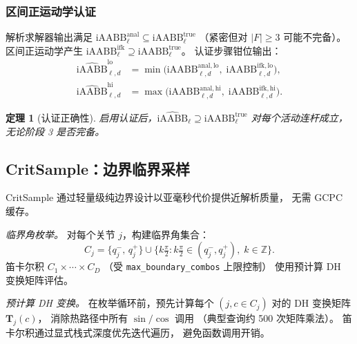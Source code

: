 \documentclass[journal]{IEEEtran}
\newtheorem{theorem}{定理}
\newcommand{\iAABB}{\text{iAABB}}
\newcommand{\bT}{\mathbf{T}}
\begin{document}

\subsubsection{区间正运动学认证}\label{sec:ifk_cert}

解析求解器输出满足
$\iAABB^{\mathrm{anal}}_\ell \subseteq \iAABB^{\mathrm{true}}_\ell$
（紧密但对 $|F| \geq 3$ 可能不完备）。
区间正运动学产生
$\iAABB^{\mathrm{ifk}}_\ell \supseteq \iAABB^{\mathrm{true}}_\ell$。
认证步骤钳位输出：
\begin{equation}\label{eq:cert_clamp}
  \begin{aligned}
    \widehat{\iAABB}_{\ell,d}^{\mathrm{lo}}
      &= \min\!\bigl(\iAABB_{\ell,d}^{\mathrm{anal,lo}},\;
                       \iAABB_{\ell,d}^{\mathrm{ifk,lo}}\bigr), \\
    \widehat{\iAABB}_{\ell,d}^{\mathrm{hi}}
      &= \max\!\bigl(\iAABB_{\ell,d}^{\mathrm{anal,hi}},\;
                       \iAABB_{\ell,d}^{\mathrm{ifk,hi}}\bigr).
  \end{aligned}
\end{equation}

\begin{theorem}[认证正确性]\label{thm:cert_sound}
启用认证后，$\widehat{\iAABB}_\ell \supseteq
\iAABB^{\mathrm{true}}_\ell$ 对每个活动连杆成立，
无论阶段 3 是否完备。
\end{theorem}

\subsection{CritSample：边界临界采样}\label{sec:critsample}

CritSample 通过轻量级纯边界设计以亚毫秒代价提供近解析质量，
无需 GCPC 缓存。

\emph{临界角枚举。}
对每个关节 $j$，构建临界角集合：
\begin{equation}
  C_j = \{q_j^-,\, q_j^+\}
  \cup \bigl\{ k\tfrac{\pi}{2} : k\tfrac{\pi}{2} \in (q_j^-,q_j^+),\;
  k \in \mathbb{Z} \bigr\}.
\end{equation}
笛卡尔积 $C_1 \times \cdots \times C_D$
（受 \texttt{max\_boundary\_combos} 上限控制）
使用预计算 DH 变换矩阵评估。

\emph{预计算 DH 变换。}
在枚举循环前，预先计算每个 $(j, c \in C_j)$ 对的
DH 变换矩阵 $\bT_j(c)$，
消除热路径中所有 $\sin/\cos$ 调用
（典型查询约 500 次矩阵乘法）。
笛卡尔积通过显式栈式深度优先迭代遍历，
避免函数调用开销。
\end{document}

